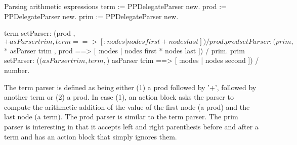 \documentclass[a4paper,10pt,twoside]{book}
\begin{document}
\begin{script}[arithmetic]{Parsing arithmetic expressions}
term := PPDelegateParser new.
prod := PPDelegateParser new.
prim := PPDelegateParser new.
 
term setParser: (prod , $+ asParser trim , term ==> [ :nodes | nodes first + nodes last ])
                     / prod.
prod setParser: (prim , $* asParser trim , prod ==> [ :nodes | nodes first * nodes last ])
                     / prim.
prim setParser: ($( asParser trim , term , $) asParser trim ==> [ :nodes | nodes second ])
                     / number.
\end{script}

The term parser is defined as being either (1) a prod followed by '+',
followed by another term or (2) a prod. In case (1), an action block
asks the parser to compute the arithmetic addition of the value of the
first node (a prod) and the last node (a term). The prod parser is
similar to the term parser. The prim parser is interesting in that it
accepts left and right parenthesis before and after a term and has an
action block that simply ignores them.
\end{document}
